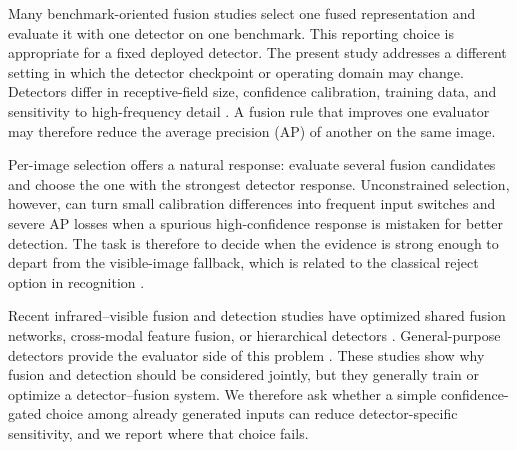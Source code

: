 \documentclass[preprint,11pt]{elsarticle}
\begin{document}
Many benchmark-oriented fusion studies select one fused representation and
evaluate it with one detector on one benchmark. This reporting choice is
appropriate for a fixed deployed detector. The present study addresses a
different setting in which the detector checkpoint or operating domain may
change. Detectors differ in receptive-field size, confidence calibration,
training data, and sensitivity to high-frequency detail
\cite{abdar2021uncertainty,gawlikowski2023uncertainty}. A fusion rule that
improves one evaluator may therefore reduce the average precision (AP) of
another on the same image.

Per-image selection offers a natural response: evaluate several fusion
candidates and choose the one with the strongest detector response.
Unconstrained selection, however, can turn small calibration differences into
frequent input switches and severe AP losses when a spurious high-confidence
response is mistaken for better detection. The task is therefore to decide
when the evidence is strong enough to depart from the visible-image fallback,
which is related to the classical reject option in recognition
\cite{chow1970reject}.

Recent infrared--visible fusion and detection studies have optimized shared
fusion networks, cross-modal feature fusion, or hierarchical detectors
\cite{zhao2025cmifdf,gao2026coifsd,an2026mrtdetr,zhang2026hffn,wan2025yolo11rgbt}.
General-purpose detectors provide the evaluator side of this problem
\cite{redmon2016yolo,zhao2024rtdetr}. These studies show why fusion and
detection should be considered jointly, but they generally train or optimize a
detector--fusion system. We therefore ask whether a simple confidence-gated
choice among already generated inputs can reduce detector-specific sensitivity,
and we report where that choice fails.
\end{document}
